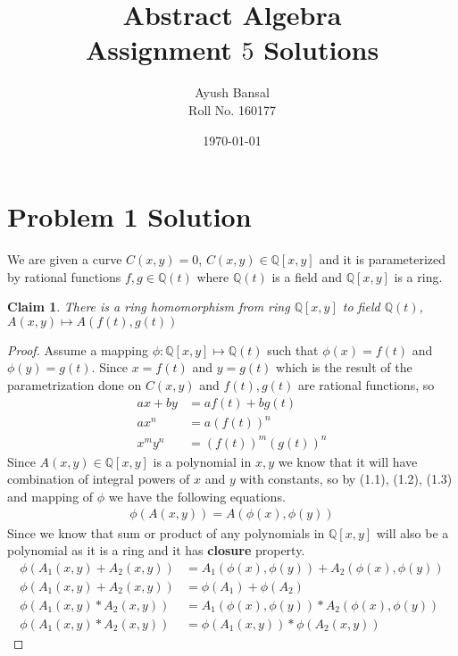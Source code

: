 \documentclass{article}
\title{\vspace{80mm}\lightgreyb Abstract Algebra \\
\lightgreyb Assignment $5$ Solutions}
\author{Ayush Bansal \\
Roll No. 160177}
\date{\today}
\let\bold\textbf
\newtheorem{claim}{Claim}[section]
\begin{document}
\clearpage\maketitle
\thispagestyle{empty}
\newpage
\setcounter{page}{1}
\section{Problem 1 Solution}{
  We are given a curve $C(x,y)=0$, $C(x,y) \in \mathbb{Q}[x,y]$ and it is parameterized by rational functions $f,g \in \mathbb{Q}(t)$ where $\mathbb{Q}(t)$ is a field and $\mathbb{Q}[x,y]$ is a ring. \newline
  \begin{claim}
    There is a ring homomorphism from ring $\mathbb{Q}[x,y]$ to field $\mathbb{Q}(t)$, $A(x,y) \mapsto A(f(t),g(t))$
  \end{claim}
  \begin{proof}
    Assume a mapping $\phi : \mathbb{Q}[x,y] \mapsto \mathbb{Q}(t)$ such that $\phi (x)=f(t)$ and $\phi (y)=g(t)$. \newline
    Since $x=f(t)$ and $y=g(t)$ which is the result of the parametrization done on $C(x,y)$ and $f(t),g(t)$ are rational functions, so
    \begin{align}
      ax+by&=af(t)+bg(t) \label{eq:1} \\
      ax^n&=a(f(t))^n \\
      x^my^n&=(f(t))^m(g(t))^n
    \end{align}
    Since $A(x,y) \in \mathbb{Q}[x,y]$ is a polynomial in $x,y$ we know that it will have combination of integral powers of $x$ and $y$ with constants, so by (1.1), (1.2), (1.3) and mapping of $\phi$ we have the following equations.
    \begin{align}
      \phi(A(x,y))=A(\phi(x),\phi(y)) \label{eq:4}
    \end{align}
    Since we know that sum or product of any polynomials in $\mathbb{Q}[x,y]$ will also be a polynomial as it is a ring and it has \bold{closure} property.
    \begin{align}
      \phi(A_1(x,y)+A_2(x,y))&=A_1(\phi(x),\phi(y))+A_2(\phi(x),\phi(y)) \label{eq:5} \\
      \phi(A_1(x,y)+A_2(x,y))&=\phi(A_1)+\phi(A_2) \\
      \phi(A_1(x,y)*A_2(x,y))&=A_1(\phi(x),\phi(y))*A_2(\phi(x),\phi(y)) \\
      \phi(A_1(x,y)*A_2(x,y))&=\phi(A_1(x,y))*\phi(A_2(x,y))
    \end{align}

\end{proof}}
\end{document}
